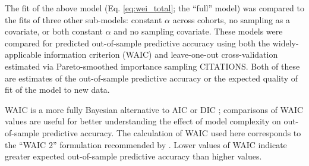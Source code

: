 \documentclass{article}
\begin{document}
The fit of the above model (Eq. \ref{eq:wei_total}; the ``full'' model) was compared to the fits of three other sub-models: constant \(\alpha\) across cohorts, no sampling as a covariate, or both constant \(\alpha\) and no sampling covariate. These models were compared for predicted out-of-sample predictive accuracy using both the widely-applicable information criterion (WAIC) and leave-one-out cross-validation estimated via Pareto-smoothed importance sampling CITATIONS. Both of these are estimates of the out-of-sample predictive accuracy or the expected quality of fit of the model to new data. 

WAIC is a more fully Bayesian alternative to AIC or DIC \citep{Watanabe2010a,Gelman2013d}; comparisons of WAIC values are useful for better understanding the effect of model complexity on out-of-sample predictive accuracy. The calculation of WAIC used here corresponds to the ``WAIC 2'' formulation recommended by \citet{Gelman2013d}. Lower values of WAIC indicate greater expected out-of-sample predictive accuracy than higher values.

%
\end{document}

